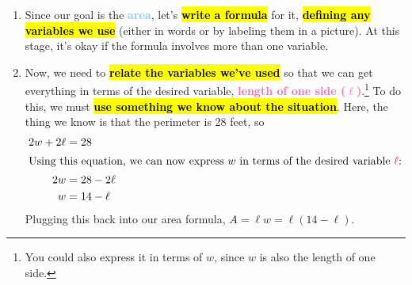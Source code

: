 \documentclass{article}
\newcommand{\goal}[1]{\textbf{\textcolor{skyblue}{#1}}}
\newcommand{\indvar}[1]{\textbf{\textcolor{hotpink}{#1}}}
\begin{document}
\begin{enumerate}
\begin{enumerate}
\begin{solution}
\begin{enumerate}[label=\arabic*.]
\begin{itemize}
          \hl{\textbf{Know:}} perimeter = 28 feet

        \item Drawing \textbf{a couple of examples} is a great way to get a feel for the situation; I try to make my examples very different from each other. Here are two examples of pens with perimeter 28 feet:
          \begin{center}
          \end{center}
        \end{itemize}

      \item Since our goal is the \goal{area}, let's \hl{\textbf{write a formula}} for it, \hl{\textbf{defining any variables we use}} (either in words or by labeling them in a picture). At this stage, it's okay if the formula involves more than one variable.

        \begin{center}
        \end{center}

      \item Now, we need to \hl{\textbf{relate the variables we've used}} so that we can get everything in terms of the desired variable, \indvar{length of one side ($\ell$)}.\footnote{You could also express it in terms of $w$, since $w$ is also the length of one side.} To do this, we must \hl{\textbf{use something we know about the situation}}. Here, the thing we know is that the perimeter is 28 feet, so
        \begin{align*}
          2w + 2 \ell &= 28 \\
          \intertext{Using this equation, we can now express $w$ in terms of the desired variable \indvar{$\ell$}:}
          2w &= 28 - 2 \ell \\
          w &= 14 - \ell
        \end{align*}
        Plugging this back into our area formula, $A = \ell w = \boxed{\ell (14 - \ell)}$.


\end{enumerate}
\end{solution}
\end{enumerate}
\end{enumerate}
\end{document}

